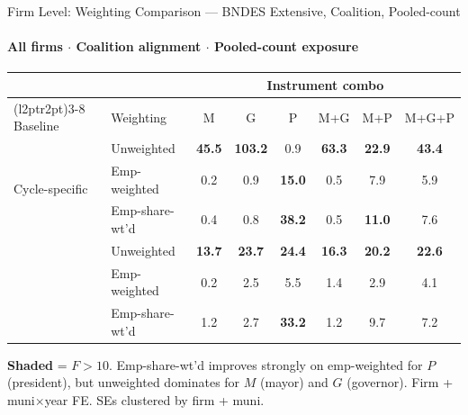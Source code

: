 \documentclass[aspectratio=169,10pt]{beamer}
\newcommand{\fpass}[1]{\cellcolor{pass}\textbf{#1}}
\begin{document}
\begin{frame}[t]{Firm Level: Weighting Comparison --- BNDES Extensive, Coalition, Pooled-count}
\framesubtitle{All firms $\cdot$ Coalition alignment $\cdot$ Pooled-count exposure}
\begin{center}
\footnotesize
\setlength{\tabcolsep}{3.5pt}
\renewcommand{\arraystretch}{1.05}
\begin{tabular}{@{}llcccccc@{}}
\toprule
 & & \multicolumn{6}{c}{Instrument combo} \\
\cmidrule(l{2pt}r{2pt}){3-8}
Baseline & Weighting & M & G & P & M+G & M+P & M+G+P \\
\midrule
\multirow{3}{*}{Cycle-specific}
  & Unweighted      & \fpass{45.5} & \fpass{103.2} & 0.9  & \fpass{63.3} & \fpass{22.9} & \fpass{43.4} \\
  & Emp-weighted    & 0.2          & 0.9           & \fpass{15.0}  & 0.5          & 7.9          & 5.9          \\
  & Emp-share-wt'd  & 0.4          & 0.8           & \fpass{38.2}  & 0.5          & \fpass{11.0} & 7.6          \\
\addlinespace[5pt]
\multirow{3}{*}{2002-fixed}
  & Unweighted      & \fpass{13.7} & \fpass{23.7}  & \fpass{24.4} & \fpass{16.3} & \fpass{20.2} & \fpass{22.6} \\
  & Emp-weighted    & 0.2          & 2.5           & 5.5          & 1.4          & 2.9          & 4.1          \\
  & Emp-share-wt'd  & 1.2          & 2.7           & \fpass{33.2} & 1.2          & 9.7          & 7.2          \\
\bottomrule
\end{tabular}
\end{center}
{\scriptsize \colorbox{pass}{\textbf{Shaded}} = $F>10$.
Emp-share-wt'd improves strongly on emp-weighted for $P$ (president), but unweighted dominates for $M$ (mayor) and $G$ (governor).
Firm + muni$\times$year FE. SEs clustered by firm + muni.}
\end{frame}

\end{document}
